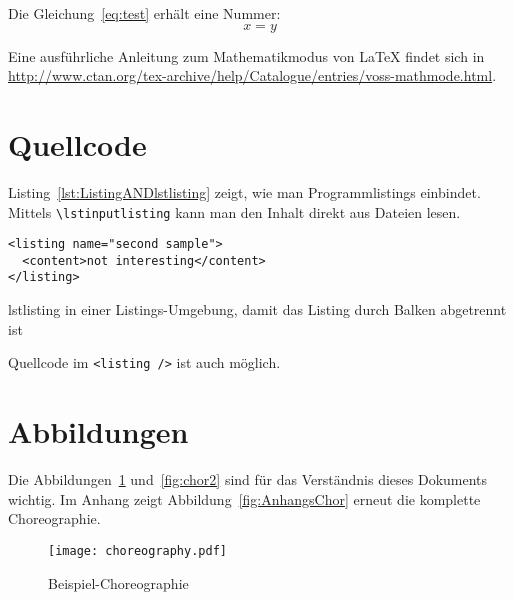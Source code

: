 Die Gleichung~\ref{eq:test} erhält eine Nummer:
\begin{equation}
\label{eq:test}
x = y
\end{equation}

Eine ausführliche Anleitung zum Mathematikmodus von LaTeX findet sich in \url{http://www.ctan.org/tex-archive/help/Catalogue/entries/voss-mathmode.html}.

\section{Quellcode}
Listing~\ref{lst:ListingANDlstlisting} zeigt, wie man Programmlistings einbindet.  Mittels \texttt{\textbackslash lstinputlisting} kann man den Inhalt direkt aus Dateien lesen.

\begin{Listing}
\begin{lstlisting}
<listing name="second sample">
  <content>not interesting</content>
</listing>
\end{lstlisting}
\caption{lstlisting in einer Listings-Umgebung, damit das Listing durch Balken abgetrennt ist}
\label{lst:ListingANDlstlisting}
\end{Listing}

Quellcode im \lstinline|<listing />| ist auch möglich.

\section{Abbildungen}
Die Abbildungen~\ref{fig:chor1} und~\ref{fig:chor2} sind für das Verständnis dieses Dokuments
wichtig. Im Anhang zeigt Abbildung~\vref{fig:AnhangsChor} erneut die komplette Choreographie.

\begin{figure}
  \begin{center}
    \texttt{[image: choreography.pdf]}
    \caption{Beispiel-Choreographie}
    \label{fig:chor1}
  \end{center}
\end{figure}

